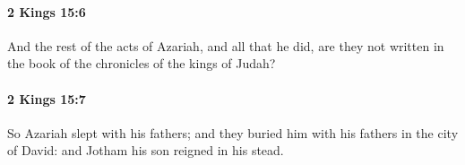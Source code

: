 		\paragraph{2 Kings 15:6} %
			\label{2KINGS-15-6}

			And the rest of the acts of Azariah, and all that he did, are they not written in the book of the chronicles of the kings of Judah?


		\paragraph{2 Kings 15:7} %
			\label{2KINGS-15-7}

			So Azariah slept with his fathers; and they buried him with his fathers in the city of David: and Jotham his son reigned in his stead.



